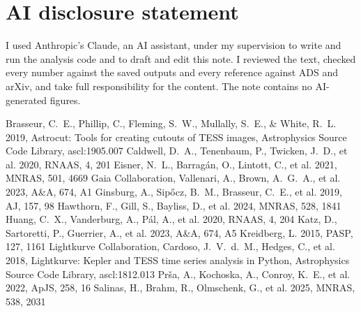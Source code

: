 \documentclass{aastex701}
\begin{document}

\section*{AI disclosure statement}
I used Anthropic's Claude, an AI assistant, under my supervision to write and run the analysis code
and to draft and edit this note. I reviewed the text, checked every number against the saved
outputs and every reference against ADS and arXiv, and take full responsibility for the content.
The note contains no AI-generated figures.

\begin{thebibliography}{}
 Brasseur, C.~E., Phillip, C., Fleming, S.~W., Mullally, S.~E., \& White, R.~L. 2019, Astrocut: Tools for creating cutouts of TESS images, Astrophysics Source Code Library, ascl:1905.007
 Caldwell, D.~A., Tenenbaum, P., Twicken, J.~D., et al. 2020, RNAAS, 4, 201
 Eisner, N.~L., Barrag\'an, O., Lintott, C., et al. 2021, MNRAS, 501, 4669
 Gaia Collaboration, Vallenari, A., Brown, A.~G.~A., et al. 2023, A\&A, 674, A1
 Ginsburg, A., Sip{\H o}cz, B.~M., Brasseur, C.~E., et al. 2019, AJ, 157, 98
 Hawthorn, F., Gill, S., Bayliss, D., et al. 2024, MNRAS, 528, 1841
 Huang, C.~X., Vanderburg, A., P\'al, A., et al. 2020, RNAAS, 4, 204
 Katz, D., Sartoretti, P., Guerrier, A., et al. 2023, A\&A, 674, A5
 Kreidberg, L. 2015, PASP, 127, 1161
 Lightkurve Collaboration, Cardoso, J.~V.~d.~M., Hedges, C., et al. 2018, Lightkurve: Kepler and TESS time series analysis in Python, Astrophysics Source Code Library, ascl:1812.013
 Pr{\v s}a, A., Kochoska, A., Conroy, K.~E., et al. 2022, ApJS, 258, 16
 Salinas, H., Brahm, R., Olmschenk, G., et al. 2025, MNRAS, 538, 2031
\end{thebibliography}
\end{document}
